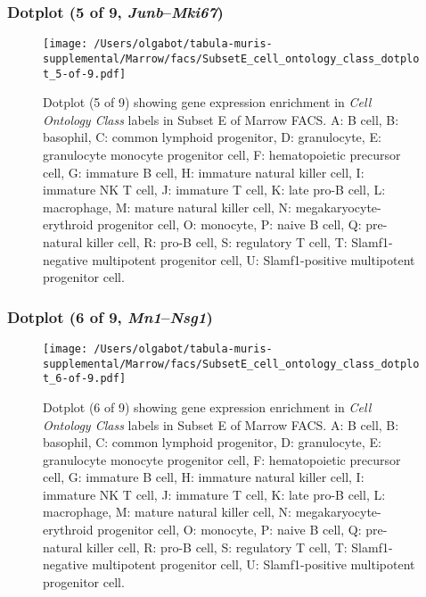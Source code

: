\subsubsection{Dotplot (5 of 9, \emph{Junb}--\emph{Mki67})}
\begin{figure}[h]
\centering
\texttt{[image: /Users/olgabot/tabula-muris-supplemental/Marrow/facs/SubsetE\_cell\_ontology\_class\_dotplot\_5-of-9.pdf]}

\caption{ Dotplot (5 of 9)  showing gene expression enrichment in \emph{Cell Ontology Class} labels in Subset E of Marrow FACS. A: B cell, B: basophil, C: common lymphoid progenitor, D: granulocyte, E: granulocyte monocyte progenitor cell, F: hematopoietic precursor cell, G: immature B cell, H: immature natural killer cell, I: immature NK T cell, J: immature T cell, K: late pro-B cell, L: macrophage, M: mature natural killer cell, N: megakaryocyte-erythroid progenitor cell, O: monocyte, P: naive B cell, Q: pre-natural killer cell, R: pro-B cell, S: regulatory T cell, T: Slamf1-negative multipotent progenitor cell, U: Slamf1-positive multipotent progenitor cell.}
\end{figure}


\clearpage

\subsubsection{Dotplot (6 of 9, \emph{Mn1}--\emph{Nsg1})}
\begin{figure}[h]
\centering
\texttt{[image: /Users/olgabot/tabula-muris-supplemental/Marrow/facs/SubsetE\_cell\_ontology\_class\_dotplot\_6-of-9.pdf]}

\caption{ Dotplot (6 of 9)  showing gene expression enrichment in \emph{Cell Ontology Class} labels in Subset E of Marrow FACS. A: B cell, B: basophil, C: common lymphoid progenitor, D: granulocyte, E: granulocyte monocyte progenitor cell, F: hematopoietic precursor cell, G: immature B cell, H: immature natural killer cell, I: immature NK T cell, J: immature T cell, K: late pro-B cell, L: macrophage, M: mature natural killer cell, N: megakaryocyte-erythroid progenitor cell, O: monocyte, P: naive B cell, Q: pre-natural killer cell, R: pro-B cell, S: regulatory T cell, T: Slamf1-negative multipotent progenitor cell, U: Slamf1-positive multipotent progenitor cell.}
\end{figure}


\clearpage

